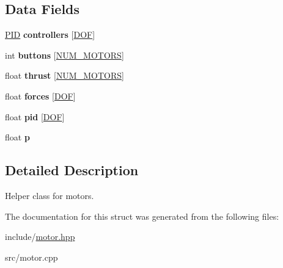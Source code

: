 \subsection*{Data Fields}
\begin{DoxyCompactItemize}
\item 
\mbox{\label{structMotors_a7cbe4b9467412e4882ff318b9375017e}} 
\hyperlink{structPID}{P\+ID} {\bfseries controllers} \mbox{[}\hyperlink{config_8h_ab5c558d88abd9517fb657be4889ee1bc}{D\+OF}\mbox{]}
\item 
\mbox{\label{structMotors_a84b2ea1a929743410df7ead8212b767a}} 
int {\bfseries buttons} \mbox{[}\hyperlink{config_8h_ae84658f12c2f1b44f59af36678cf3dcc}{N\+U\+M\+\_\+\+M\+O\+T\+O\+RS}\mbox{]}
\item 
\mbox{\label{structMotors_ac8d20987287ffda85eed109c3bf80a12}} 
float {\bfseries thrust} \mbox{[}\hyperlink{config_8h_ae84658f12c2f1b44f59af36678cf3dcc}{N\+U\+M\+\_\+\+M\+O\+T\+O\+RS}\mbox{]}
\item 
\mbox{\label{structMotors_a17cb9b1c3fc7749984c4622439901f84}} 
float {\bfseries forces} \mbox{[}\hyperlink{config_8h_ab5c558d88abd9517fb657be4889ee1bc}{D\+OF}\mbox{]}
\item 
\mbox{\label{structMotors_a94c46cb5dab8c60c9fae75cc6b7af629}} 
float {\bfseries pid} \mbox{[}\hyperlink{config_8h_ab5c558d88abd9517fb657be4889ee1bc}{D\+OF}\mbox{]}
\item 
\mbox{\label{structMotors_a46e39ac60edebef57fca46f878e2c0b5}} 
float {\bfseries p}
\end{DoxyCompactItemize}


\subsection{Detailed Description}
Helper class for motors. 

The documentation for this struct was generated from the following files\+:\begin{DoxyCompactItemize}
\item 
include/\hyperlink{motor_8hpp}{motor.\+hpp}\item 
src/motor.\+cpp\end{DoxyCompactItemize}
